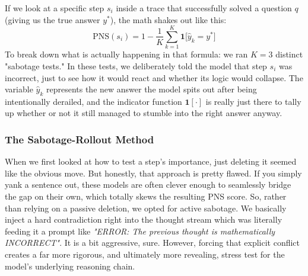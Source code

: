\documentclass[conference,compsoc]{IEEEtran}
\begin{document}
If we look at a specific step $s_i$ inside a trace that successfully solved a question $q$ (giving us the true answer $y^*$), the math shakes out like this:
\begin{equation}
\text{PNS}(s_i) = 1 - \frac{1}{K} \sum_{k=1}^{K} \mathbf{1}\bigl[\hat{y}_k = y^*\bigr]
\end{equation}
To break down what is actually happening in that formula: we ran $K=3$ distinct "sabotage tests." In these tests, we deliberately told the model that step $s_i$ was incorrect, just to see how it would react and whether its logic would collapse. The variable $\hat{y}_k$ represents the new answer the model spits out after being intentionally derailed, and the indicator function $\mathbf{1}[\cdot]$ is really just there to tally up whether or not it still managed to stumble into the right answer anyway.

\subsubsection{The Sabotage-Rollout Method}
When we first looked at how to test a step's importance, just deleting it seemed like the obvious move. But honestly, that approach is pretty flawed. If you simply yank a sentence out, these models are often clever enough to seamlessly bridge the gap on their own, which totally skews the resulting PNS score. So, rather than relying on a passive deletion, we opted for active sabotage. We basically inject a hard contradiction right into the thought stream which was literally feeding it a prompt like \textit{"ERROR: The previous thought is mathematically INCORRECT"}. It is a bit aggressive, sure. However, forcing that explicit conflict creates a far more rigorous, and ultimately more revealing, stress test for the model's underlying reasoning chain.
\end{document}
